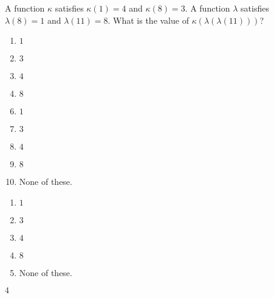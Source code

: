  
A function $\kappa$ satisfies $\kappa(1)=4$ and $\kappa(8)=3$.  A function $\lambda$ satisfies $\lambda(8)=1$ and $\lambda(11)=8$.  What is the value of $\kappa(\lambda(\lambda(11)))$?


\ifsat
	\begin{enumerate}[label=\Alph*)]
		\item $1 $ 
		\item $3 $ 
		\item $4 $ %
		\item $8 $
	\end{enumerate}
\else
\fi

\ifacteven
	\begin{enumerate}[label=\textbf{\Alph*.},itemsep=\fill,align=left]
		\setcounter{enumii}{5}
		\item $1 $ 
		\item $3 $ 
		\item $4 $ %
		\addtocounter{enumii}{1}
		\item $8 $
		\item None of these. 
	\end{enumerate}
\else
\fi

\ifactodd
	\begin{enumerate}[label=\textbf{\Alph*.},itemsep=\fill,align=left]
		\item $1 $ 
		\item $3 $ 
		\item $4 $ %
		\item $8 $
		\item None of these. 
	\end{enumerate}
\else
\fi

\ifgridin
 $4 $ %
		
\else
\fi


